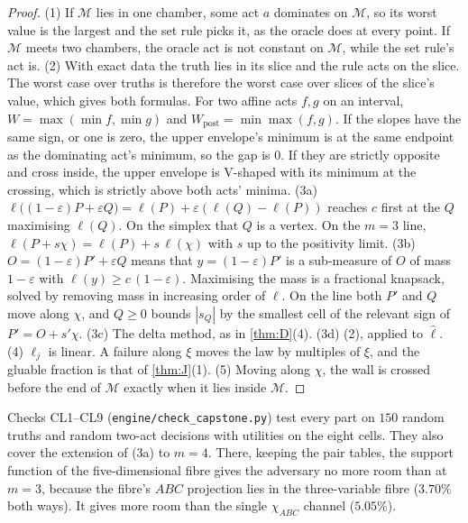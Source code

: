 \documentclass[11pt]{article}
\theoremstyle{definition}\newtheorem{definition}{Definition}\newtheorem{remark}{Remark}
\begin{document}
\begin{proof}
(1) If $\mathcal M$ lies in one chamber, some act $a$ dominates on $\mathcal M$, so its worst value is the largest and the set rule picks
it, as the oracle does at every point. If $\mathcal M$ meets two chambers, the oracle act is not constant on $\mathcal M$, while the
set rule's act is.
(2) With exact data the truth lies in its slice and the rule acts on the slice. The worst case over truths is therefore the worst case over
slices of the slice's value, which gives both formulas. For two affine acts $f,g$ on an interval, $W=\max(\min f,\min g)$ and
$W_{\mathrm{post}}=\min\max(f,g)$. If the slopes have the same sign, or one is zero, the upper envelope's minimum is at the same
endpoint as the dominating act's minimum, so the gap is $0$. If they are strictly opposite and cross inside, the upper envelope is
V-shaped with its minimum at the crossing, which is strictly above both acts' minima.
(3a) $\ell\bigl((1-\varepsilon)P+\varepsilon Q\bigr)=\ell(P)+\varepsilon(\ell(Q)-\ell(P))$ reaches $c$ first at the $Q$ maximising $\ell(Q)$.
On the simplex that $Q$ is a vertex. On the $m=3$ line, $\ell(P+s\chi)=\ell(P)+s\,\ell(\chi)$ with $s$ up to the positivity limit.
(3b) $O=(1-\varepsilon)P'+\varepsilon Q$ means that $y=(1-\varepsilon)P'$ is a sub-measure of $O$ of mass $1-\varepsilon$ with
$\ell(y)\ge c\,(1-\varepsilon)$. Maximising the mass is a fractional knapsack, solved by removing mass in increasing order of $\ell$. On
the line both $P'$ and $Q$ move along $\chi$, and $Q\ge0$ bounds $|s_Q|$ by the smallest cell of the relevant sign of $P'=O+s'\chi$.
(3c) The delta method, as in \cref{thm:D}(4). (3d) (2), applied to $\hat\ell$.
(4) $\ell_j$ is linear. A failure along $\xi$ moves the law by multiples of $\xi$, and the gluable fraction is that of \cref{thm:J}(1).
(5) Moving along $\chi$, the wall is crossed before the end of $\mathcal M$ exactly when it lies inside $\mathcal M$.
\end{proof}

Checks CL1--CL9 (\texttt{engine/check\_capstone.py}) test every part on $150$ random truths and random two-act decisions with utilities
on the eight cells. They also cover the extension of (3a) to $m=4$. There, keeping the pair tables, the support function of the
five-dimensional fibre gives the adversary no more room than at $m=3$, because the fibre's $ABC$ projection lies in the three-variable
fibre ($3.70\%$ both ways). It gives more room than the single $\chi_{ABC}$ channel ($5.05\%$).
\end{document}
